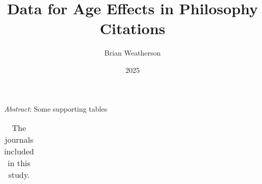 \documentclass[
  11pt,
  letterpaper,
  DIV=11,
  numbers=noendperiod,
  twoside]{scrartcl}
\title{Data for Age Effects in Philosophy Citations}
\author{Brian Weatherson}
\date{2025}
\renewenvironment{abstract}
 {\vspace{-1.25cm}
 \quotation\small\noindent\emph{Abstract}:}
 {\endquotation}
\renewenvironment{abstract}
 {\quotation\small\noindent\emph{Abstract}:}
 {\endquotation\vspace{-0.02cm}}
\begin{document}
\maketitle
\begin{abstract}
Some supporting tables
\end{abstract}


\begin{longtable}[]{@{}
  >{\raggedright\arraybackslash}p{}
  >{\raggedleft\arraybackslash}p{}
  >{\raggedleft\arraybackslash}p{}
  >{\raggedleft\arraybackslash}p{}@{}}

\caption{\label{tbl-list-of-journals}The journals included in this
study.}

\tabularnewline


\end{longtable}
\end{document}
